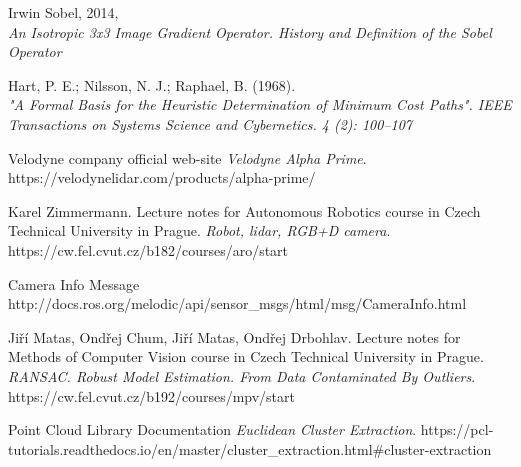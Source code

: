 \documentclass{ctuthesis}
\begin{document}
\begin{thebibliography}{9}
Irwin Sobel, 2014,
\\\textit{An Isotropic 3x3 Image Gradient Operator. History and Definition of the Sobel Operator}

Hart, P. E.; Nilsson, N. J.; Raphael, B. (1968).
\\\textit{"A Formal Basis for the Heuristic Determination of Minimum Cost Paths". IEEE Transactions on Systems Science and Cybernetics. 4 (2): 100–107}

Velodyne company official web-site
\textit{Velodyne Alpha Prime}. 
https://velodynelidar.com/products/alpha-prime/

Karel Zimmermann. Lecture notes for Autonomous Robotics course in Czech Technical University in Prague.
\textit{Robot, lidar, RGB+D camera}. 
https://cw.fel.cvut.cz/b182/courses/aro/start

Camera Info Message
\\http://docs.ros.org/melodic/api/sensor\_msgs/html/msg/CameraInfo.html

Jiří Matas, Ondřej Chum, Jiří Matas, Ondřej Drbohlav. Lecture notes for Methods of Computer Vision course in Czech Technical University in Prague.
\textit{RANSAC. Robust Model Estimation. From Data Contaminated By Outliers}. 
https://cw.fel.cvut.cz/b192/courses/mpv/start

Point Cloud Library Documentation
\textit{Euclidean Cluster Extraction}. 
https://pcl-tutorials.readthedocs.io/en/master/cluster\_extraction.html\#cluster-extraction

\end{thebibliography}
\end{document}
